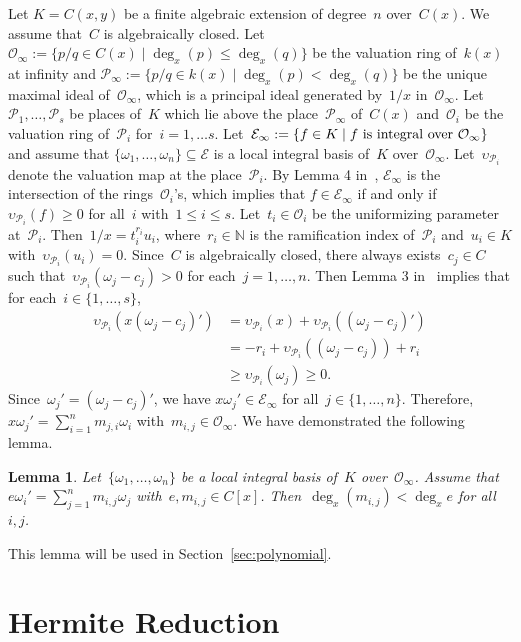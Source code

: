 \documentclass{sig-alternate}
\newtheorem{lemma}[theorem]{Lemma}
\newcommand{\bN}{ {\mathbb N}}
\newcommand{\cO}{ {\mathcal O}}
\newcommand{\cE}{ {\mathcal E}}
\newcommand{\cP}{ {\mathcal P}}
\begin{document}
Let $K= C(x, y)$ be a finite algebraic extension of degree~$n$ over~$C(x)$. We assume that~$C$ is algebraically
closed. Let~$\mathcal{O}_\infty := \{p/q \in C(x) \mid \deg_x(p) \leq \deg_x(q)\}$ be the valuation ring of~$k(x)$
at infinity
and $\mathcal{P}_\infty := \{p/q\in k(x) \mid \deg_x(p) < \deg_x(q)\}$ be the unique maximal ideal of~$\cO_\infty$,
which is a principal ideal generated by~$1/x$ in~$\cO_\infty$. Let~$\cP_1, \ldots, \cP_s$ be places of~$K$ which
lie above the place~$\cP_\infty$ of~$C(x)$ and~$\cO_i$ be the valuation ring of~$\cP_i$ for~$i=1, \ldots s$.
Let~$\cE_\infty := \{f\in K \mid \text{$f$ is integral over~$\cO_\infty$}\}$
and assume that $\{\omega_1, \ldots, \omega_n\}\subseteq \cE$ is a local integral basis of~$K$ over~$\cO_\infty$.
Let~$\upsilon_{\cP_i}$ denote the valuation map at the place~$\cP_i$.
By Lemma 4 in~\cite[p.\ 56]{Chevalley1951}, $\cE_\infty$ is the intersection of the rings~$\cO_i$'s, which
implies that $f \in \cE_\infty$ if and only if $\upsilon_{\cP_i}(f) \geq 0 $ for all~$i$ with~$1\leq i \leq s$.
Let~$t_i\in \cO_i$ be the uniformizing parameter at~$\cP_i$. Then~$1/x = t_i^{r_i}u_i$, where~$r_i\in \bN$ is the
ramification index of~$\cP_i$ and~$u_i\in K$ with~$\upsilon_{\cP_i}(u_i) = 0$. Since~$C$ is algebraically closed,
there always exists~$c_j\in C$ such that~$\upsilon_{\cP_i}(\omega_j - c_j) >0$ for each~$j=1, \ldots, n$.
Then Lemma 3 in~\cite[p.\ 49 ]{trager84} implies that for each~$i \in \{1, \ldots, s\}$,
\begin{align*}
\upsilon_{\cP_i} (x (\omega_j-c_j)')&  = \upsilon_{\cP_i}(x) + \upsilon_{\cP_i}((\omega_j-c_j)')\\
   & = -r_i + \upsilon_{\cP_i}((\omega_j-c_j)) + r_i\\
   & \geq \upsilon_{\cP_i}(\omega_j) \geq 0.
\end{align*}
Since~$\omega_j' = (\omega_j-c_j)'$, we have $x\omega_j' \in \cE_\infty$ for all~$j\in \{1, \ldots, n\}$.
Therefore, $x\omega_j' = \sum_{i=1}^n m_{j, i}\omega_i$ with~$m_{i, j}\in \cO_\infty$.
We have demonstrated the following lemma.

\begin{lemma} \label{lemma:degM}
Let~$\{\omega_1, \ldots, \omega_n\}$ be a local integral basis of~$K$ over~$\cO_\infty$.
Assume that~$e \omega_i' = \sum_{j=1}^n m_{i, j} \omega_j$ with~$e, m_{i, j}\in C[x]$.
Then~$\deg_x(m_{i,j})<\deg_x e$ for all $i, j$.
\end{lemma}
This lemma will be used in Section~\ref{sec:polynomial}.

\section{Hermite Reduction}\label{sec:hermite}
\end{document}
